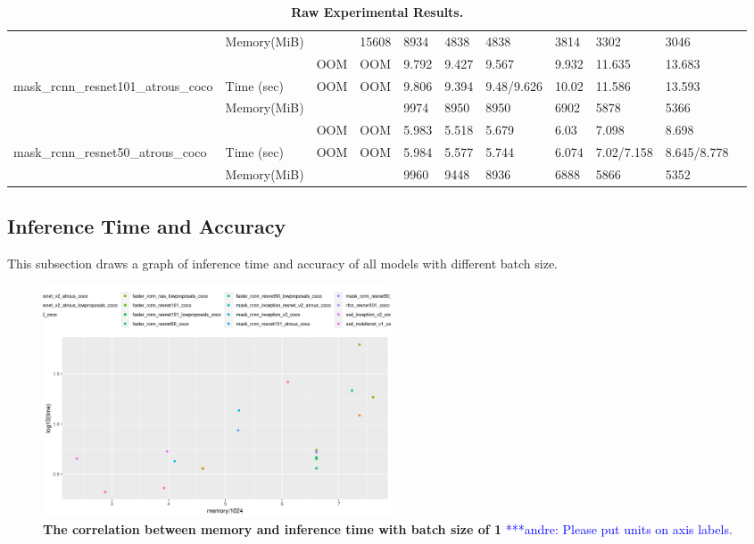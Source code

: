 \documentclass[conference]{IEEEtran}
\newcommand{\alnote}[1]{ {\textcolor{blue} { ***andre: #1 }}}
\newcommand{\alnote}[1]{}
\begin{document}
\begin{table}[]
{\begin{tabular}{lllllllllll}
                                                                & Memory(MiB)   &                     & 15608              & 8934              & 4838              & 4838             & 3814   & 3302              & 3046        &          \\
                                                                &               & OOM                 & OOM                & 9.792             & 9.427             & 9.567            & 9.932  & 11.635            & 13.683      &          \\
mask\_rcnn\_resnet101\_atrous\_coco                             & Time (sec)    & OOM                 & OOM                & 9.806             & 9.394             & 9.48/9.626       & 10.02  & 11.586            & 13.593      &          \\
                                                                & Memory(MiB)   &                     &                    & 9974              & 8950              & 8950             & 6902   & 5878              & 5366        &          \\
                                                                &               & OOM                 & OOM                & 5.983             & 5.518             & 5.679            & 6.03   & 7.098             & 8.698       &          \\
mask\_rcnn\_resnet50\_atrous\_coco                              & Time (sec)    & OOM                 & OOM                & 5.984             & 5.577             & 5.744            & 6.074  & 7.02/7.158        & 8.645/8.778 &          \\
                                                                & Memory(MiB)   &                     &                    & 9960              & 9448              & 8936             & 6888   & 5866              & 5352        &         
\end{tabular}%
}
\caption{\textbf{Raw Experimental Results.}}
\label{table:raw-results}
\end{table}

\subsection{Inference Time and Accuracy}
This subsection draws a graph of inference time and accuracy of all models with different batch size.

\begin{figure}[htpb]
	  \centering
	  \includegraphics[width=0.5\textwidth]{MemoryVSRunning}
	  \caption{\textbf{The correlation between memory and inference time with batch size of 1}\alnote{Please put units on axis labels.}}
	  \label{fig:memory-running}
\end{figure}
\end{document}
